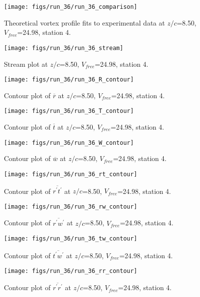 \begin{figure}[H]
\centering
\texttt{[image: figs/run\_36/run\_36\_comparison]}
\caption{Theoretical vortex profile fits to experimental data at $z/c$=8.50, $V_{free}$=24.98, station 4.}
\end{figure}


\begin{figure}[H]
\centering
\texttt{[image: figs/run\_36/run\_36\_stream]}
\caption{Stream plot at $z/c$=8.50, $V_{free}$=24.98, station 4.}
\end{figure}


\begin{figure}[H]
\centering
\texttt{[image: figs/run\_36/run\_36\_R\_contour]}
\caption{Contour plot of $\overline{r}$ at $z/c$=8.50, $V_{free}$=24.98, station 4.}
\end{figure}


\begin{figure}[H]
\centering
\texttt{[image: figs/run\_36/run\_36\_T\_contour]}
\caption{Contour plot of $\overline{t}$ at $z/c$=8.50, $V_{free}$=24.98, station 4.}
\end{figure}


\begin{figure}[H]
\centering
\texttt{[image: figs/run\_36/run\_36\_W\_contour]}
\caption{Contour plot of $\overline{w}$ at $z/c$=8.50, $V_{free}$=24.98, station 4.}
\end{figure}


\begin{figure}[H]
\centering
\texttt{[image: figs/run\_36/run\_36\_rt\_contour]}
\caption{Contour plot of $\overline{r^\prime t^\prime}$ at $z/c$=8.50, $V_{free}$=24.98, station 4.}
\end{figure}


\begin{figure}[H]
\centering
\texttt{[image: figs/run\_36/run\_36\_rw\_contour]}
\caption{Contour plot of $\overline{r^\prime w^\prime}$ at $z/c$=8.50, $V_{free}$=24.98, station 4.}
\end{figure}


\begin{figure}[H]
\centering
\texttt{[image: figs/run\_36/run\_36\_tw\_contour]}
\caption{Contour plot of $\overline{t^\prime w^\prime}$ at $z/c$=8.50, $V_{free}$=24.98, station 4.}
\end{figure}


\begin{figure}[H]
\centering
\texttt{[image: figs/run\_36/run\_36\_rr\_contour]}
\caption{Contour plot of $\overline{r^\prime r^\prime}$ at $z/c$=8.50, $V_{free}$=24.98, station 4.}
\end{figure}


